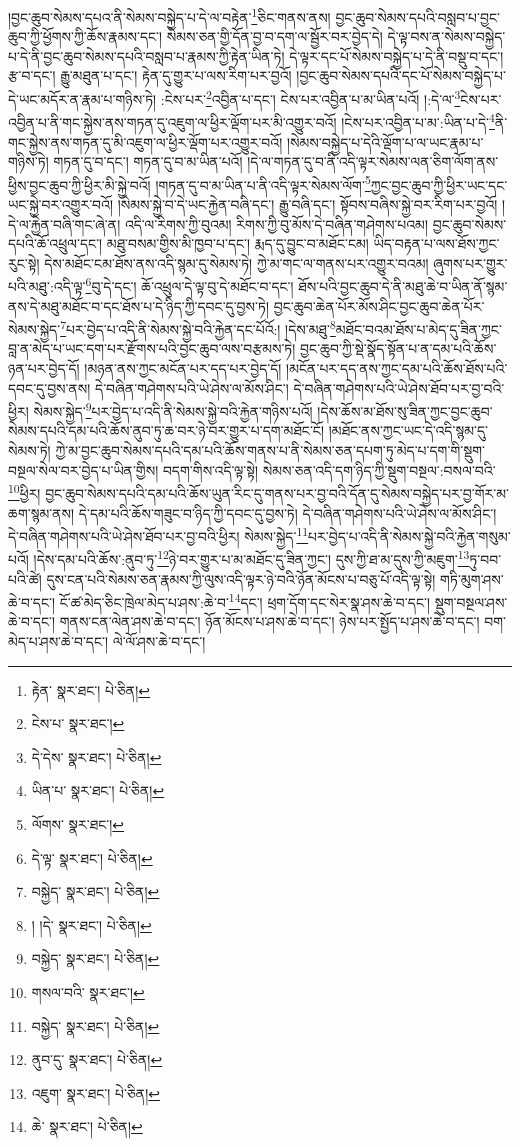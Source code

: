 །བྱང་ཆུབ་སེམས་དཔའ་ནི་སེམས་བསྐྱེད་པ་དེ་ལ་བརྟེན་\footnote{རྟེན་  སྣར་ཐང་།  པེ་ཅིན། }ཅིང་གནས་ནས། བྱང་ཆུབ་སེམས་དཔའི་བསླབ་པ་བྱང་ཆུབ་ཀྱི་ཕྱོགས་ཀྱི་ཆོས་རྣམས་དང་། སེམས་ཅན་གྱི་དོན་བྱ་བ་དག་ལ་སྦྱོར་བར་བྱེད་དེ། དེ་ལྟ་བས་ན་སེམས་བསྐྱེད་པ་དེ་ནི་བྱང་ཆུབ་སེམས་དཔའི་བསླབ་པ་རྣམས་ཀྱི་རྟེན་ཡིན་ཏེ། དེ་ལྟར་དང་པོ་སེམས་བསྐྱེད་པ་དེ་ནི་བསྡུ་བ་དང་། རྩ་བ་དང་། རྒྱུ་མཐུན་པ་དང་། རྟེན་དུ་གྱུར་པ་ལས་རིག་པར་བྱའོ། །བྱང་ཆུབ་སེམས་དཔའི་དང་པོ་སེམས་བསྐྱེད་པ་དེ་ཡང་མདོར་ན་རྣམ་པ་གཉིས་ཏེ། :ངེས་པར་\footnote{ངེས་པ་  སྣར་ཐང་། }འབྱིན་པ་དང་། ངེས་པར་འབྱིན་པ་མ་ཡིན་པའོ། །:དེ་ལ་\footnote{དེ་དེས་  སྣར་ཐང་།  པེ་ཅིན། }ངེས་པར་འབྱིན་པ་ནི་གང་སྐྱེས་ནས་གཏན་དུ་འཇུག་ལ་ཕྱིར་ལྡོག་པར་མི་འགྱུར་བའོ། །ངེས་པར་འབྱིན་པ་མ་:ཡིན་པ་དེ་\footnote{ཡིན་པ་  སྣར་ཐང་།  པེ་ཅིན། }ནི་གང་སྐྱེས་ནས་གཏན་དུ་མི་འཇུག་ལ་ཕྱིར་ལྡོག་པར་འགྱུར་བའོ། །སེམས་བསྐྱེད་པ་དེའི་ལྡོག་པ་ལ་ཡང་རྣམ་པ་གཉིས་ཏེ། གཏན་དུ་བ་དང་། གཏན་དུ་བ་མ་ཡིན་པའོ། །དེ་ལ་གཏན་དུ་བ་ནི་འདི་ལྟར་སེམས་ལན་ཅིག་ལོག་ནས་ཕྱིས་བྱང་ཆུབ་ཀྱི་ཕྱིར་མི་སྐྱེ་བའོ། །གཏན་དུ་བ་མ་ཡིན་པ་ནི་འདི་ལྟར་སེམས་ལོག་\footnote{ལོགས་  སྣར་ཐང་། }ཀྱང་བྱང་ཆུབ་ཀྱི་ཕྱིར་ཡང་དང་ཡང་སྐྱེ་བར་འགྱུར་བའོ། །སེམས་སྐྱེ་བ་དེ་ཡང་རྐྱེན་བཞི་དང་། རྒྱུ་བཞི་དང་། སྟོབས་བཞིས་སྐྱེ་བར་རིག་པར་བྱའོ། །དེ་ལ་རྐྱེན་བཞི་གང་ཞེ་ན། འདི་ལ་རིགས་ཀྱི་བུའམ། རིགས་ཀྱི་བུ་མོས་དེ་བཞིན་གཤེགས་པའམ། བྱང་ཆུབ་སེམས་དཔའི་ཆོ་འཕྲུལ་དང་། མཐུ་བསམ་གྱིས་མི་ཁྱབ་པ་དང་། རྨད་དུ་བྱུང་བ་མཐོང་ངམ། ཡིད་བརྟན་པ་ལས་ཐོས་ཀྱང་རུང་སྟེ། དེས་མཐོང་ངམ་ཐོས་ནས་འདི་སྙམ་དུ་སེམས་ཏེ། ཀྱེ་མ་གང་ལ་གནས་པར་འགྱུར་བའམ། ཞུགས་པར་གྱུར་པའི་མཐུ་:འདི་ལྟ་\footnote{དེ་ལྟ་  སྣར་ཐང་།  པེ་ཅིན། }བུ་དེ་དང་། ཆོ་འཕྲུལ་དེ་ལྟ་བུ་དེ་མཐོང་བ་དང་། ཐོས་པའི་བྱང་ཆུབ་དེ་ནི་མཐུ་ཆེ་བ་ཡིན་ནོ་སྙམ་ནས་དེ་མཐུ་མཐོང་བ་དང་ཐོས་པ་དེ་ཉིད་ཀྱི་དབང་དུ་བྱས་ཏེ། བྱང་ཆུབ་ཆེན་པོར་མོས་ཤིང་བྱང་ཆུབ་ཆེན་པོར་སེམས་སྐྱེད་\footnote{བསྐྱེད་  སྣར་ཐང་།  པེ་ཅིན། }པར་བྱེད་པ་འདི་ནི་སེམས་སྐྱེ་བའི་རྐྱེན་དང་པོའོ:། །དེས་མཐུ་\footnote{། །དེ་  སྣར་ཐང་།  པེ་ཅིན། }མཐོང་བའམ་ཐོས་པ་མེད་དུ་ཟིན་ཀྱང་བླ་ན་མེད་པ་ཡང་དག་པར་རྫོགས་པའི་བྱང་ཆུབ་ལས་བརྩམས་ཏེ། བྱང་ཆུབ་ཀྱི་སྡེ་སྣོད་སྟོན་པ་ན་དམ་པའི་ཆོས་ཉན་པར་བྱེད་དོ། །མཉན་ནས་ཀྱང་མངོན་པར་དད་པར་བྱེད་དོ། །མངོན་པར་དད་ནས་ཀྱང་དམ་པའི་ཆོས་ཐོས་པའི་དབང་དུ་བྱས་ནས། དེ་བཞིན་གཤེགས་པའི་ཡེ་ཤེས་ལ་མོས་ཤིང་། དེ་བཞིན་གཤེགས་པའི་ཡེ་ཤེས་ཐོབ་པར་བྱ་བའི་ཕྱིར། སེམས་སྐྱེད་\footnote{བསྐྱེད་  སྣར་ཐང་།  པེ་ཅིན། }པར་བྱེད་པ་འདི་ནི་སེམས་སྐྱེ་བའི་རྐྱེན་གཉིས་པའོ། །དེས་ཆོས་མ་ཐོས་སུ་ཟིན་ཀྱང་བྱང་ཆུབ་སེམས་དཔའི་དམ་པའི་ཆོས་ནུབ་ཏུ་ཆ་བར་ཉེ་བར་གྱུར་པ་དག་མཐོང་ངོ། །མཐོང་ནས་ཀྱང་ཡང་དེ་འདི་སྙམ་དུ་སེམས་ཏེ། ཀྱེ་མ་བྱང་ཆུབ་སེམས་དཔའི་དམ་པའི་ཆོས་གནས་པ་ནི་སེམས་ཅན་དཔག་ཏུ་མེད་པ་དག་གི་སྡུག་བསྔལ་སེལ་བར་བྱེད་པ་ཡིན་གྱིས། བདག་གིས་འདི་ལྟ་སྟེ། སེམས་ཅན་འདི་དག་ཉིད་ཀྱི་སྡུག་བསྔལ་:བསལ་བའི་\footnote{གསལ་བའི་  སྣར་ཐང་། }ཕྱིར། བྱང་ཆུབ་སེམས་དཔའི་དམ་པའི་ཆོས་ཡུན་རིང་དུ་གནས་པར་བྱ་བའི་དོན་དུ་སེམས་བསྐྱེད་པར་བྱ་གོར་མ་ཆག་སྙམ་ནས། དེ་དམ་པའི་ཆོས་གཟུང་བ་ཉིད་ཀྱི་དབང་དུ་བྱས་ཏེ། དེ་བཞིན་གཤེགས་པའི་ཡེ་ཤེས་ལ་མོས་ཤིང་། དེ་བཞིན་གཤེགས་པའི་ཡེ་ཤེས་ཐོབ་པར་བྱ་བའི་ཕྱིར། སེམས་སྐྱེད་\footnote{བསྐྱེད་  སྣར་ཐང་།  པེ་ཅིན། }པར་བྱེད་པ་འདི་ནི་སེམས་སྐྱེ་བའི་རྐྱེན་གསུམ་པའོ། །དེས་དམ་པའི་ཆོས་:ནུབ་ཏུ་\footnote{ནུབ་དུ་  སྣར་ཐང་།  པེ་ཅིན། }ཉེ་བར་གྱུར་པ་མ་མཐོང་དུ་ཟིན་ཀྱང་། དུས་ཀྱི་ཐ་མ་དུས་ཀྱི་མཇུག་\footnote{འཇུག་  སྣར་ཐང་།  པེ་ཅིན། }ཏུ་བབ་པའི་ཚེ། དུས་ངན་པའི་སེམས་ཅན་རྣམས་ཀྱི་ལུས་འདི་ལྟར་ཉེ་བའི་ཉོན་མོངས་པ་བཅུ་པོ་འདི་ལྟ་སྟེ། གཏི་མུག་ཤས་ཆེ་བ་དང་། ངོ་ཚ་མེད་ཅིང་ཁྲེལ་མེད་པ་ཤས་:ཆེ་བ་\footnote{ཆེ་  སྣར་ཐང་།  པེ་ཅིན། }དང་། ཕྲག་དོག་དང་སེར་སྣ་ཤས་ཆེ་བ་དང་། སྡུག་བསྔལ་ཤས་ཆེ་བ་དང་། གནས་ངན་ལེན་ཤས་ཆེ་བ་དང་། ཉོན་མོངས་པ་ཤས་ཆེ་བ་དང་། ཉེས་པར་སྤྱོད་པ་ཤས་ཆེ་བ་དང་། བག་མེད་པ་ཤས་ཆེ་བ་དང་། ལེ་ལོ་ཤས་ཆེ་བ་དང་། 